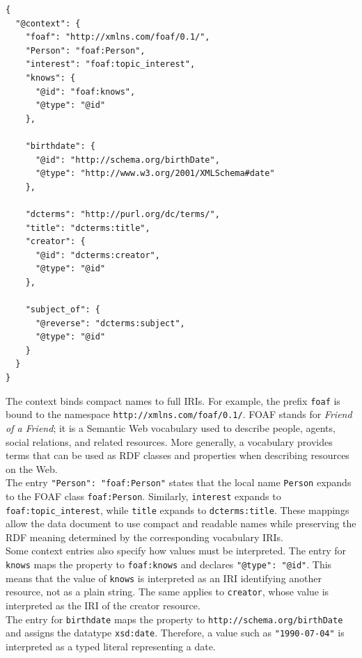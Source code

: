 \documentclass{scrbook}
\begin{document}
	\begin{lstlisting}
{
  "@context": {
    "foaf": "http://xmlns.com/foaf/0.1/",
    "Person": "foaf:Person",
    "interest": "foaf:topic_interest",
    "knows": {
      "@id": "foaf:knows",
      "@type": "@id"
    },
    
    "birthdate": {
      "@id": "http://schema.org/birthDate",
      "@type": "http://www.w3.org/2001/XMLSchema#date"
    },
    
    "dcterms": "http://purl.org/dc/terms/",
    "title": "dcterms:title",
    "creator": {
      "@id": "dcterms:creator",
      "@type": "@id"
    },
    
    "subject_of": {
      "@reverse": "dcterms:subject",
      "@type": "@id"
    }
  }
}
	\end{lstlisting}
	
	The context binds compact names to full IRIs. For example, the prefix \texttt{foaf} is bound to the namespace \texttt{http://xmlns.com/foaf/0.1/}. FOAF stands for \emph{Friend of a Friend}; it is a Semantic Web vocabulary used to describe people, agents, social relations, and related resources. More generally, a vocabulary provides terms that can be used as RDF classes and properties when describing resources on the Web.\\
	
	The entry \texttt{"Person": "foaf:Person"} states that the local name \texttt{Person} expands to the FOAF class \texttt{foaf:Person}. Similarly, \texttt{interest} expands to \texttt{foaf:topic\_interest}, while \texttt{title} expands to \texttt{dcterms:title}. These mappings allow the data document to use compact and readable names while preserving the RDF meaning determined by the corresponding vocabulary IRIs.\\
	
	Some context entries also specify how values must be interpreted. The entry for \texttt{knows} maps the property to \texttt{foaf:knows} and declares \texttt{"@type": "@id"}. This means that the value of \texttt{knows} is interpreted as an IRI identifying another resource, not as a plain string. The same applies to \texttt{creator}, whose value is interpreted as the IRI of the creator resource.\\
	
	The entry for \texttt{birthdate} maps the property to \texttt{http://schema.org/birthDate} and assigns the datatype \texttt{xsd:date}. Therefore, a value such as \texttt{"1990-07-04"} is interpreted as a typed literal representing a date.\\
	
\end{document}
